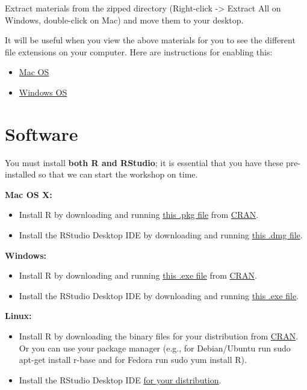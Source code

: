 \documentclass[]{book}
\providecommand{\tightlist}{%
  \setlength{\itemsep}{0pt}\setlength{\parskip}{0pt}}
\begin{document}
Extract materials from the zipped directory (Right-click -\textgreater{} Extract All on Windows, double-click on Mac) and move them to your desktop.

It will be useful when you view the above materials for you to see the different file extensions on your computer. Here are instructions for enabling this:

\begin{itemize}
\tightlist
\item
  \href{https://support.apple.com/guide/mac-help/show-or-hide-filename-extensions-on-mac-mchlp2304/mac}{Mac OS}
\item
  \href{http://kb.winzip.com/kb/entry/26/}{Windows OS}
\end{itemize}

\hypertarget{software}{%
\section{Software}\label{software}}

You must install \textbf{both R and RStudio}; it is essential that you have these pre-installed so that we can start the workshop on time.

\textbf{Mac OS X:}

\begin{itemize}
\tightlist
\item
  Install R by downloading and running \href{http://cran.r-project.org/bin/macosx/R-latest.pkg}{this .pkg file} from \href{http://cran.r-project.org/index.html}{CRAN}.
\item
  Install the RStudio Desktop IDE by downloading and running \href{https://download1.rstudio.org/desktop/macos/RStudio-1.2.5033.dmg}{this .dmg file}.
\end{itemize}

\textbf{Windows:}

\begin{itemize}
\tightlist
\item
  Install R by downloading and running \href{https://cran.r-project.org/bin/windows/base/release.htm}{this .exe file} from \href{http://cran.r-project.org/index.html}{CRAN}.
\item
  Install the RStudio Desktop IDE by downloading and running \href{https://download1.rstudio.org/desktop/windows/RStudio-1.2.5033.exe}{this .exe file}.
\end{itemize}

\textbf{Linux:}

\begin{itemize}
\tightlist
\item
  Install R by downloading the binary files for your distribution from \href{http://cran.r-project.org/index.html}{CRAN}. Or you can use your package manager (e.g., for Debian/Ubuntu run sudo apt-get install r-base and for Fedora run sudo yum install R).
\item
  Install the RStudio Desktop IDE \href{https://rstudio.com/products/rstudio/download/\#download}{for your distribution}.
\end{itemize}
\end{document}
